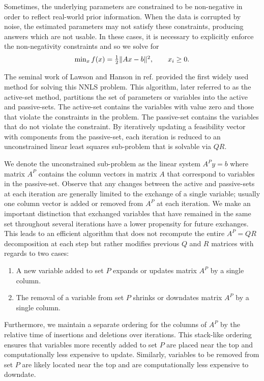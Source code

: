 \documentclass{report}
\begin{document}
Sometimes, the underlying parameters are constrained to be non-negative
in order to reflect real-world prior information. When the data is
corrupted by noise, the estimated parameters may not satisfy these
constraints, producing answers which are not usable. In these cases, it
is necessary to explicitly enforce the non-negativity constraints and so
we solve for
\begin{eqnarray} \begin{array}{c}
\min_xf(x)=\frac{1}{2}\|Ax-b\|^2,\qquad x_i\geq 0.
\end{array}\nonumber \end{eqnarray}

The seminal work of Lawson and Hanson in ref. \cite{BIB_LAWSON} provided
the first widely used method for solving this NNLS problem. This
algorithm, later referred to as the active-set method, partitions the set
of parameters or variables into the active and passive-sets. The
active-set contains the variables with value zero and those that violate
the constraints in the problem. The passive-set contains the variables
that do not violate the constraint. By iteratively updating a feasibility
vector with components from the passive-set, each iteration is reduced to
an unconstrained linear least squares sub-problem that is solvable via
$QR$.

We denote the unconstrained sub-problem as the linear system $A^Py=b$
where matrix $A^P$ contains the column vectors in matrix $A$ that
correspond to variables in the passive-set. Observe that any changes
between the active and passive-sets at each iteration are generally
limited to the exchange of a single variable; usually one column vector
is added or removed from $A^P$ at each iteration. We make an important
distinction that exchanged variables that have remained in the same set
throughout several iterations have a lower propensity for future
exchanges. This leads to an efficient algorithm that does not recompute
the entire $A^P=QR$ decomposition at each step but rather modifies
previous $Q$ and $R$ matrices with regards to two cases:
\begin{enumerate}
\item A new variable added to set $P$ expands or updates matrix $A^P$ by a single column.
\item The removal of a variable from set $P$ shrinks or downdates matrix
$A^P$ by a single column.
\end{enumerate}
Furthermore, we maintain a separate ordering for the columns of $A^P$ by
the relative time of insertions and deletions over iterations. This
stack-like ordering ensures that variables more recently added to set $P$
are placed near the top and computationally less expensive to update.
Similarly, variables to be removed from set $P$ are likely located near
the top and are computationally less expensive to downdate.
\end{document}
